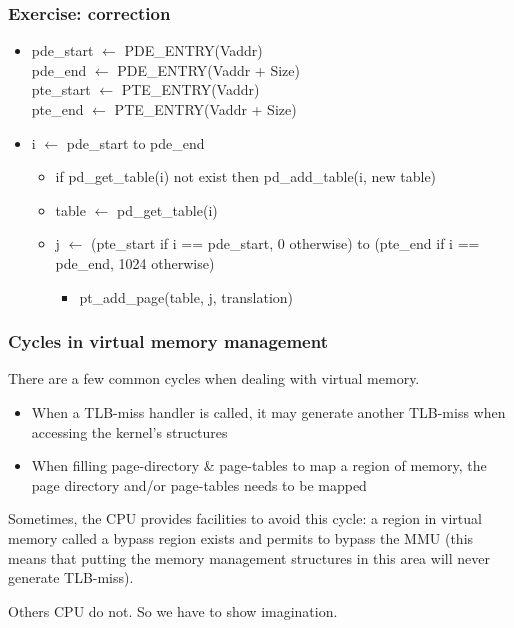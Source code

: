 
\begin{frame}
  \frametitle{Exercise: correction}

  \begin{itemize}
  \item
    pde\_start $\leftarrow$ PDE\_ENTRY(Vaddr) \\
    pde\_end $\leftarrow$ PDE\_ENTRY(Vaddr + Size) \\
    pte\_start $\leftarrow$ PTE\_ENTRY(Vaddr) \\
    pte\_end $\leftarrow$ PTE\_ENTRY(Vaddr + Size)
  \item
    i $\leftarrow$ pde\_start to pde\_end
    \begin{itemize}
    \item
      if pd\_get\_table(i) not exist then pd\_add\_table(i, new table)
    \item
      table $\leftarrow$ pd\_get\_table(i)
    \item
      j $\leftarrow$ (pte\_start if i == pde\_start, 0 otherwise) to (pte\_end if i == pde\_end, 1024 otherwise)
      \begin{itemize}
      \item
        pt\_add\_page(table, j, translation)
      \end{itemize}
    \end{itemize}
  \end{itemize}

\end{frame}


\begin{frame}
  \frametitle{Cycles in virtual memory management}

  There are a few common cycles when dealing with virtual memory.

  \begin{itemize}
  \item
    When a TLB-miss handler is called, it may generate another
    TLB-miss when accessing the kernel's structures
  \item
    When filling page-directory \& page-tables to map a region of
    memory, the page directory and/or page-tables needs to be mapped
  \end{itemize}

  \-

  Sometimes, the CPU provides facilities to avoid this cycle: a region
  in virtual memory called a bypass region exists and permits to
  bypass the MMU (this means that putting the memory management
  structures in this area will never generate TLB-miss).

  \-

  Others CPU do not. So we have to show imagination.

\end{frame}

